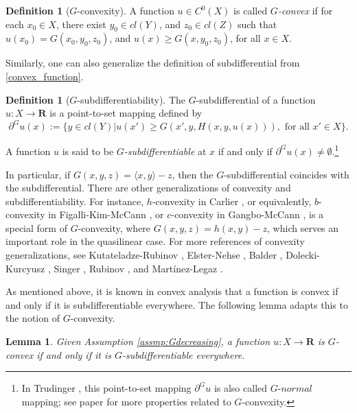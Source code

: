 \documentclass[a4paper, 11pt]{amsart}
\numberwithin{equation}{section}
\theoremstyle{plain}
\newtheorem{lemma}[theorem]{Lemma}
\theoremstyle{definition}
\newtheorem{definition}[theorem]{Definition}
\theoremstyle{remark}
\newcommand{\R}{\mathbf{R}}
\begin{document}
\begin{definition}[$G$-convexity]
	A function $u\in C^0(X)$ is called {\it $G$-convex} if for each $x_0 \in X$, there exist $y_0 \in   cl(Y)$, and $z_0 \in  cl(Z)$ such that $u(x_0)=G(x_0, y_0, z_0)$, and $u(x)\ge G(x, y_0, z_0)$, for all $x\in X$.
\end{definition}


Similarly, one can also generalize the definition of subdifferential from \eqref{convex_function}.

\begin{definition}[$G$-subdifferentiability]
	The $G$-subdifferential of a 
	function $u: X \longrightarrow \R$ is a point-to-set mapping defined by
	\begin{equation*}
	\partial^G u(x):= \{ y\in  cl(Y)| u(x')\ge G(x',y, H(x,y,u(x))), \text{ for all } x'\in X\}.
	\end{equation*}
	
	A function $u$ is said to be {\it $G$-subdifferentiable} at $x$ if and only if $\partial^G u(x) \neq \emptyset$.\footnote{In Trudinger \cite{Trudinger14}, this point-to-set mapping $\partial^G u$ is also called $G$-$normal$ mapping; see paper for more properties related to $G$-convexity.}
\end{definition}




In particular, if $G(x,y,z) = \langle x, y \rangle - z$, then the $G$-subdifferential coincides with the subdifferential. There are other generalizations of convexity and subdifferentiability. For instance, $h$-convexity in Carlier \cite{Carlier01}, or equivalently, $b$-convexity in Figalli-Kim-McCann \cite{FigalliKimMcCann11}, or $c$-convexity in  Gangbo-McCann \cite{GangboMcCann96}, is a special form of $G$-convexity, where $G(x,y,z)=  h(x,y) -z$, which serves an important role in the quasilinear case. For more references of convexity generalizations, see Kutateladze-Rubinov \cite{KutateladzeRubinov72}, Elster-Nehse \cite{ElsterNehse74}, Balder \cite{Balder77}, Dolecki-Kurcyusz \cite{DoleckiKurcyusz78},  Singer \cite{Singer97},  Rubinov \cite{Rubinov00a}, and Martínez-Legaz \cite{MartinezLegaz05}.\medskip


As mentioned above, it is known in convex analysis that a function is convex if and only if it is subdifferentiable everywhere. The following lemma adapts this to the notion of $G$-convexity. 

\begin{lemma}\label{convex-subdiff}
	Given Assumption \ref{assmp:Gdecreasing}, a function $u: X \longrightarrow \R$ is $G$-convex if and only if it is $G$-subdifferentiable everywhere.
\end{lemma}
\end{document}
